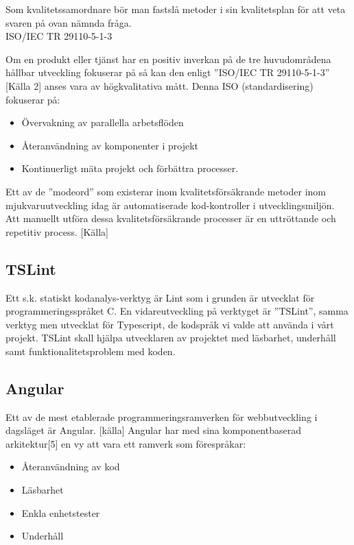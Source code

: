 Som kvalitetssamordnare bör man fastslå metoder i sin kvalitetsplan för att veta svaren på ovan nämnda fråga. \\

ISO/IEC TR 29110-5-1-3

Om en produkt eller tjänst har en positiv inverkan på de tre huvudområdena hållbar utveckling fokuserar på så kan den enligt ”ISO/IEC TR 29110-5-1-3” [Källa 2] anses vara av högkvalitativa mått.  Denna ISO (standardisering) fokuserar på: 

\begin{itemize}
	\item Övervakning av parallella arbetsflöden
	\item Återanvändning av komponenter i projekt
	\item Kontinuerligt mäta projekt och förbättra processer.
\end{itemize}

Ett av de ”modeord” som existerar inom kvalitetsförsäkrande metoder inom mjukvaruutveckling idag är automatiserade kod-kontroller i utvecklingsmiljön. Att manuellt utföra dessa kvalitetsförsäkrande processer är en uttröttande och repetitiv process. [Källa]
\subsection{TSLint}
Ett s.k. statiskt kodanalys-verktyg är Lint som i grunden är utvecklat för programmeringsspråket C. En vidareutveckling på verktyget är ”TSLint”, samma verktyg men utvecklat för Typescript, de kodspråk vi valde att använda i vårt projekt. TSLint skall hjälpa utvecklaren av projektet med läsbarhet, underhåll samt funktionalitetsproblem med koden.

\subsection{Angular}
Ett av de mest etablerade programmeringsramverken för webbutveckling i dagsläget är Angular. [källa] Angular har med sina komponentbaserad arkitektur[5] en vy att vara ett ramverk som förespråkar:

\begin{itemize}
	\item Återanvändning av kod
	\item Läsbarhet
	\item Enkla enhetstester
	\item Underhåll
\end{itemize}


